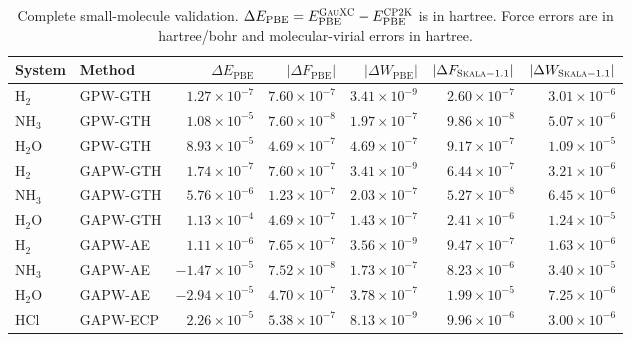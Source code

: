 \documentclass[10pt]{article}
\newcommand{\Skala}{\textsc{Skala}}
\newcommand{\GauXC}{\textsc{GauXC}}
\newcommand{\CPtwoK}{\textsc{CP2K}}
\newcommand{\GPW}{\textsc{GPW}}
\newcommand{\GAPW}{\textsc{GAPW}}
\newcommand{\GTH}{\textsc{GTH}}
\newcommand{\GPWGTH}{\GPW{}-\GTH{}}
\newcommand{\GAPWAE}{\GAPW{}-AE}
\newcommand{\GAPWGTH}{\GAPW{}-\GTH{}}
\newcommand{\GAPWECP}{\GAPW{}-ECP}
\newcommand{\SITableFont}{\normalsize}
\begin{document}
\begin{table}[htbp]
\centering
\caption{{Complete small-molecule validation.  \(\Delta E_{\mathrm{PBE}}=E_{\mathrm{PBE}}^{\GauXC{}}-E_{\mathrm{PBE}}^{\CPtwoK{}}\) is in hartree.  Force errors are in hartree/bohr and molecular-virial errors in hartree.}}
\label{tab:si_validation_full}
\SITableFont
\setlength{\tabcolsep}{3pt}
\begin{tabular}{@{}llrrrrr@{}}
\hline
System & Method & \(\Delta E_{\mathrm{PBE}}\) & \(|\Delta F_{\mathrm{PBE}}|\) & \(|\Delta W_{\mathrm{PBE}}|\) & \(|\Delta F_{\Skala{}-1.1}|\) & \(|\Delta W_{\Skala{}-1.1}|\)\\
\hline
H$_2$ & \GPWGTH{} & \(1.27\times10^{-7}\) & \(7.60\times10^{-7}\) & \(3.41\times10^{-9}\) & \(2.60\times10^{-7}\) & \(3.01\times10^{-6}\)\\
NH$_3$ & \GPWGTH{} & \(1.08\times10^{-5}\) & \(7.60\times10^{-8}\) & \(1.97\times10^{-7}\) & \(9.86\times10^{-8}\) & \(5.07\times10^{-6}\)\\
H$_2$O & \GPWGTH{} & \(8.93\times10^{-5}\) & \(4.69\times10^{-7}\) & \(4.69\times10^{-7}\) & \(9.17\times10^{-7}\) & \(1.09\times10^{-5}\)\\
H$_2$ & \GAPWGTH{} & \(1.74\times10^{-7}\) & \(7.60\times10^{-7}\) & \(3.41\times10^{-9}\) & \(6.44\times10^{-7}\) & \(3.21\times10^{-6}\)\\
NH$_3$ & \GAPWGTH{} & \(5.76\times10^{-6}\) & \(1.23\times10^{-7}\) & \(2.03\times10^{-7}\) & \(5.27\times10^{-8}\) & \(6.45\times10^{-6}\)\\
H$_2$O & \GAPWGTH{} & \(1.13\times10^{-4}\) & \(4.69\times10^{-7}\) & \(1.43\times10^{-7}\) & \(2.41\times10^{-6}\) & \(1.24\times10^{-5}\)\\
H$_2$ & \GAPWAE{} & \(1.11\times10^{-6}\) & \(7.65\times10^{-7}\) & \(3.56\times10^{-9}\) & \(9.47\times10^{-7}\) & \(1.63\times10^{-6}\)\\
NH$_3$ & \GAPWAE{} & \(-1.47\times10^{-5}\) & \(7.52\times10^{-8}\) & \(1.73\times10^{-7}\) & \(8.23\times10^{-6}\) & \(3.40\times10^{-5}\)\\
H$_2$O & \GAPWAE{} & \(-2.94\times10^{-5}\) & \(4.70\times10^{-7}\) & \(3.78\times10^{-7}\) & \(1.99\times10^{-5}\) & \(7.25\times10^{-6}\)\\
HCl & \GAPWECP{} & \(2.26\times10^{-5}\) & \(5.38\times10^{-7}\) & \(8.13\times10^{-9}\) & \(9.96\times10^{-6}\) & \(3.00\times10^{-6}\)\\
\hline
\end{tabular}
\end{table}
\endgroup
\end{document}

